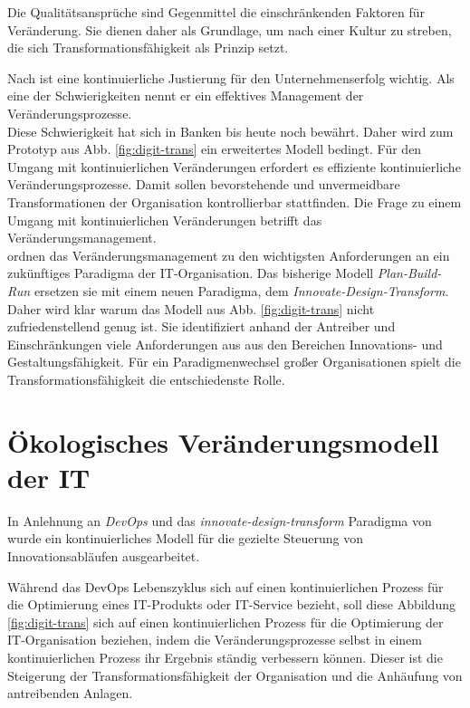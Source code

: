 Die Qualitätsansprüche sind Gegenmittel die einschränkenden Faktoren für Veränderung.
Sie dienen daher als Grundlage, um nach einer Kultur zu streben, die sich Transformationsfähigkeit als Prinzip setzt.

Nach \citet[S.30]{Bussmann2006} ist eine kontinuierliche Justierung für den Unternehmenserfolg wichtig. Als eine der Schwierigkeiten nennt er ein effektives Management der Veränderungsprozesse.
\medskip
\\
Diese Schwierigkeit hat sich in Banken bis heute noch bewährt.
Daher wird zum Prototyp aus Abb. \ref{fig:digit-trans} ein erweitertes Modell bedingt. Für den Umgang mit kontinuierlichen Veränderungen erfordert es effiziente kontinuierliche Veränderungsprozesse.
Damit sollen bevorstehende und unvermeidbare Transformationen der Organisation kontrollierbar stattfinden.
Die Frage zu einem Umgang mit kontinuierlichen Veränderungen betrifft das Veränderungsmanagement.
\medskip
\\
\citet[S. 184f]{Koch2016} ordnen das Veränderungsmanagement zu den wichtigsten Anforderungen an ein zukünftiges Paradigma der IT-Organisation. Das bisherige Modell \emph{Plan-Build-Run} ersetzen sie mit einem neuen Paradigma, dem \emph{Innovate-Design-Transform}.
\medskip
\\
Daher wird klar warum das Modell aus Abb. \ref{fig:digit-trans} nicht zufriedenstellend genug ist. Sie identifiziert anhand der Antreiber und Einschränkungen viele Anforderungen aus \cite[Tab. 11.1]{Koch2016} aus den Bereichen Innovations- und Gestaltungsfähigkeit. Für ein Paradigmenwechsel großer Organisationen spielt die Transformationsfähigkeit die entschiedenste Rolle.

\section{Ökologisches Veränderungsmodell der IT}
\label{idta-modell-chap}
In Anlehnung an \emph{DevOps} \cite{Alt2017} und das \emph{innovate-design-transform} Paradigma von \citet{Koch2016} wurde ein kontinuierliches Modell für die gezielte Steuerung von Innovationsabläufen \cite{Ganswindt2006} ausgearbeitet.

Während das DevOps Lebenszyklus \cite{Alt2017} sich auf einen kontinuierlichen Prozess für die Optimierung eines IT-Produkts oder IT-Service bezieht, soll diese Abbildung \ref{fig:digit-trans} sich auf einen kontinuierlichen Prozess für die Optimierung der IT-Organisation beziehen, indem die Veränderungsprozesse selbst in einem kontinuierlichen Prozess ihr Ergebnis ständig verbessern können. Dieser ist die Steigerung der Transformationsfähigkeit der Organisation und die Anhäufung von antreibenden Anlagen.
\medskip
\\
 
